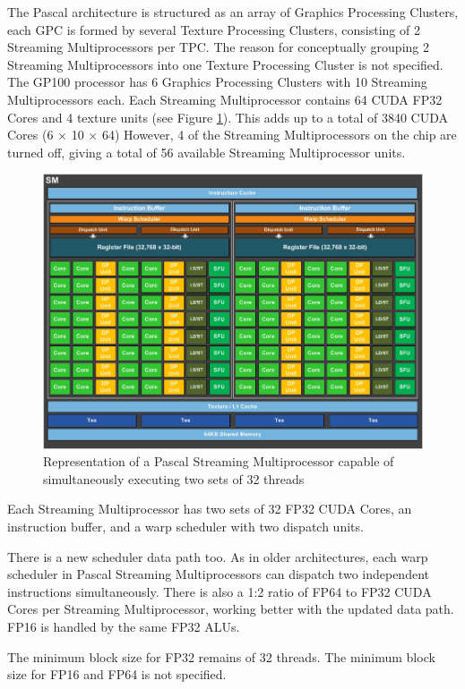 The Pascal architecture is structured as an array of Graphics Processing Clusters, each GPC is formed by several Texture Processing Clusters, consisting of 2 Streaming Multiprocessors per TPC.
The reason for conceptually grouping 2 Streaming Multiprocessors into one Texture Processing Cluster is not specified.
The GP100 processor has 6 Graphics Processing Clusters with 10 Streaming Multiprocessors each.
Each Streaming Multiprocessor contains 64 CUDA FP32 Cores and 4 texture units (see Figure \ref{fig:sm}).
This adds up to a total of 3840 CUDA Cores (6 $\times$ 10 $\times$ 64)
However, 4 of the Streaming Multiprocessors on the chip are turned off, giving a total of 56 available Streaming Multiprocessor units.

\begin{figure}[ht!]
    \centering
    \includegraphics[width=\linewidth]{gp100_sm}
    \caption{Representation of a Pascal Streaming Multiprocessor capable of simultaneously executing two sets of 32 threads}
    \label{fig:sm}
\end{figure}

Each Streaming Multiprocessor has two sets of 32 FP32 CUDA Cores, an instruction buffer, and a warp scheduler with two dispatch units.

There is a new scheduler data path too.
As in older architectures, each warp scheduler in Pascal Streaming Multiprocessors can dispatch two independent instructions simultaneously.
There is also a 1:2 ratio of FP64 to FP32 CUDA Cores per Streaming Multiprocessor, working better with the updated data path.
FP16 is handled by the same FP32 ALUs.

The minimum block size for FP32 remains of 32 threads.
The minimum block size for FP16 and FP64 is not specified.

